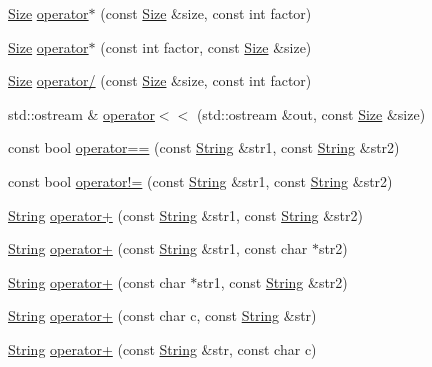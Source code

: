 \begin{DoxyCompactItemize}
\item 
\hyperlink{classprism_1_1_size}{Size} \hyperlink{namespaceprism_a3d8e53ee3208e09e8736a77be3f485c9}{operator$\ast$} (const \hyperlink{classprism_1_1_size}{Size} \&size, const int factor)
\item 
\hyperlink{classprism_1_1_size}{Size} \hyperlink{namespaceprism_acd79758984cccce0dddfb459af65f6e1}{operator$\ast$} (const int factor, const \hyperlink{classprism_1_1_size}{Size} \&size)
\item 
\hyperlink{classprism_1_1_size}{Size} \hyperlink{namespaceprism_ad7e100bd6b1730deaab53d1218e29a67}{operator/} (const \hyperlink{classprism_1_1_size}{Size} \&size, const int factor)
\item 
std\+::ostream \& \hyperlink{namespaceprism_ad6335168e27f481d86ae42da444006d1}{operator$<$$<$} (std\+::ostream \&out, const \hyperlink{classprism_1_1_size}{Size} \&size)
\item 
const bool \hyperlink{namespaceprism_a0e7bfee93ae735b5af7e566ddd8c4f65}{operator==} (const \hyperlink{classprism_1_1_string}{String} \&str1, const \hyperlink{classprism_1_1_string}{String} \&str2)
\item 
const bool \hyperlink{namespaceprism_a5c2215edf9ab445c3c1791217d131b15}{operator!=} (const \hyperlink{classprism_1_1_string}{String} \&str1, const \hyperlink{classprism_1_1_string}{String} \&str2)
\item 
\hyperlink{classprism_1_1_string}{String} \hyperlink{namespaceprism_a4d401776635a858ca8f279b6ee6a35f4}{operator+} (const \hyperlink{classprism_1_1_string}{String} \&str1, const \hyperlink{classprism_1_1_string}{String} \&str2)
\item 
\hyperlink{classprism_1_1_string}{String} \hyperlink{namespaceprism_aa0e135948cfe325d658fd6e65ef3b754}{operator+} (const \hyperlink{classprism_1_1_string}{String} \&str1, const char $\ast$str2)
\item 
\hyperlink{classprism_1_1_string}{String} \hyperlink{namespaceprism_a6eceab4fd9349dda5fc47e0806ce168f}{operator+} (const char $\ast$str1, const \hyperlink{classprism_1_1_string}{String} \&str2)
\item 
\hyperlink{classprism_1_1_string}{String} \hyperlink{namespaceprism_ae7a27033c4b2b541f9f582119bcd188a}{operator+} (const char c, const \hyperlink{classprism_1_1_string}{String} \&str)
\item 
\hyperlink{classprism_1_1_string}{String} \hyperlink{namespaceprism_a07058e194f9108ce695ab99b6aaa7db1}{operator+} (const \hyperlink{classprism_1_1_string}{String} \&str, const char c)

\end{DoxyCompactItemize}
